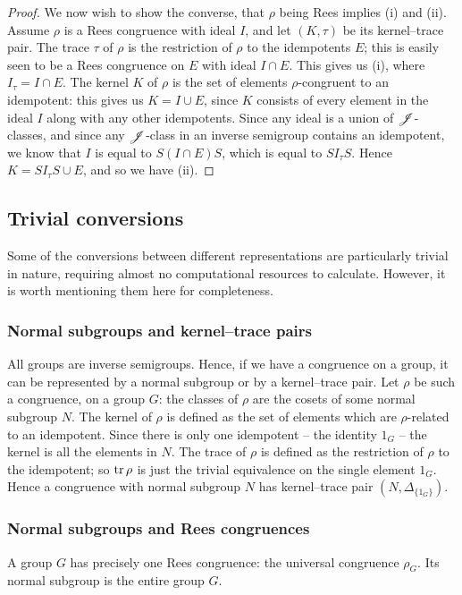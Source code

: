 \begin{theorem}
\begin{proof}
    We now wish to show the converse, that $\rho$ being Rees implies (i) and
    (ii).  Assume $\rho$ is a Rees congruence with ideal $I$, and let $(K,\tau)$
    be its kernel--trace pair.  The trace $\tau$ of $\rho$ is the restriction of
    $\rho$ to the idempotents $E$; this is easily seen to be a Rees congruence
    on $E$ with ideal $I \cap E$.  This gives us (i), where $I_\tau = I \cap E$.
    The kernel $K$ of $\rho$ is the set of elements $\rho$-congruent to an
    idempotent: this gives us $K = I \cup E$, since $K$ consists of every
    element in the ideal $I$ along with any other idempotents.  Since any ideal
    is a union of $\mathrel{\mathscr{J}}$-classes, and since any $\mathrel{\mathscr{J}}$-class in an inverse
    semigroup contains an idempotent, we know that $I$ is equal to
    $S(I \cap E)S$, which is equal to $S I_\tau S$.  Hence
    $K = S I_\tau S \cup E$, and so we have (ii).
  \end{proof}
\end{theorem}

\subsection{Trivial conversions}
\label{sec:trivial-conversions}
Some of the conversions between different representations are particularly
trivial in nature, requiring almost no computational resources to calculate.
However, it is worth mentioning them here for completeness.

\subsubsection{Normal subgroups and kernel--trace pairs}
All groups are inverse semigroups.  Hence, if we have a congruence on a group,
it can be represented by a normal subgroup or by a kernel--trace pair.  Let
$\rho$ be such a congruence, on a group $G$: the classes of $\rho$ are the
cosets of some normal subgroup $N$.  The kernel of $\rho$ is defined as the set
of elements which are $\rho$-related to an idempotent.  Since there is only one
idempotent -- the identity $1_G$ -- the kernel is all the elements in $N$.  The
trace of $\rho$ is defined as the restriction of $\rho$ to the idempotent; so
$\operatorname{tr}\rho$ is just the trivial equivalence on the single element $1_G$.  Hence a
congruence with normal subgroup $N$ has kernel--trace pair
$(N, \Delta_{\{1_G\}})$.

\subsubsection{Normal subgroups and Rees congruences}
A group $G$ has precisely one Rees congruence: the universal congruence
$\rho_G$.  Its normal subgroup is the entire group $G$.

